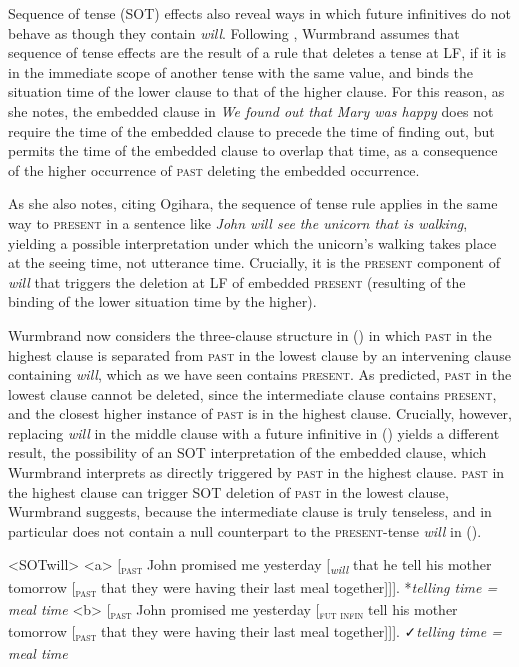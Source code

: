 \documentclass[output=paper]{langscibook}
\begin{document}
\noindent Sequence of tense (SOT) effects also reveal ways in which future infinitives do not behave as though they contain \textit{will}. Following \citet{Ogihara1996}, Wurmbrand assumes that sequence of tense effects are the result of a rule that deletes a tense at LF, if it is in the immediate scope of another tense with the same value, and binds the situation time of the lower clause to that of the higher clause. For this reason, as she notes, the embedded clause in \textit{We found out that Mary was happy} does not require the time of the embedded clause to precede the time of finding out, but permits the time of the embedded clause to overlap that time, as a consequence of the higher occurrence of \textsc{past} deleting the embedded occurrence. 

As she also notes, citing Ogihara, the sequence of tense rule applies in the same way to \textsc{present} in a sentence like \textit{John will see the unicorn that is walking}, yielding a possible interpretation under which the unicorn's walking takes place at the seeing time, not utterance time. Crucially, it is the \textsc{present} component of \textit{will} that triggers the deletion at LF of embedded \textsc{present} (resulting of the binding of the lower situation time by the higher). 

Wurmbrand now considers the three-clause structure in () in which \textsc{past} in the highest clause is separated from \textsc{past} in the lowest clause by an intervening clause containing \textit{will}, which as we have seen contains \textsc{present}. As predicted, \textsc{past} in the lowest clause cannot be deleted, since the intermediate clause contains \textsc{present}, and the closest higher instance of \textsc{past} is in the highest clause. Crucially, however, replacing \textit{will} in the middle clause with a future infinitive in () yields a different result, the possibility of an SOT interpretation of the embedded clause, which Wurmbrand interprets as directly triggered by \textsc{past} in the highest clause. \textsc{past} in the highest clause can trigger SOT deletion of \textsc{past} in the lowest clause, Wurmbrand suggests, because the intermediate clause is truly tenseless, and in particular does not contain a null counterpart to the \textsc{present}-tense \textit{will} in (). 

\pex<SOTwill>
\a<a>
{[}\textsubscript{\textsc{past}} John promised me yesterday {[}\textsubscript{\textit{will}} that he  tell his mother tomorrow {[}\textsubscript{\textsc{past}} that they were having their last meal together{]]]}.\smallbreak  
*\textit{telling time = meal time}
\a<b> {[}\textsubscript{\textsc{past}} John promised me yesterday {[}\textsubscript{\textsc{fut infin}}  tell his mother tomorrow {[}\textsubscript{\textsc{past}} that they were having their last meal together{]]]}.\smallbreak 
✓\textit{telling time = meal time}
\xe
\end{document}
